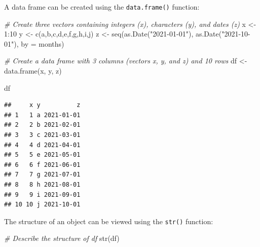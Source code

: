 \documentclass[
]{book}
\newenvironment{Shaded}{\begin{snugshade}}{\end{snugshade}}
\newcommand{\AttributeTok}[1]{\textcolor[rgb]{0.77,0.63,0.00}{#1}}
\newcommand{\CommentTok}[1]{\textcolor[rgb]{0.56,0.35,0.01}{\textit{#1}}}
\newcommand{\DecValTok}[1]{\textcolor[rgb]{0.00,0.00,0.81}{#1}}
\newcommand{\FunctionTok}[1]{\textcolor[rgb]{0.00,0.00,0.00}{#1}}
\newcommand{\NormalTok}[1]{#1}
\newcommand{\OtherTok}[1]{\textcolor[rgb]{0.56,0.35,0.01}{#1}}
\newcommand{\SpecialCharTok}[1]{\textcolor[rgb]{0.00,0.00,0.00}{#1}}
\newcommand{\StringTok}[1]{\textcolor[rgb]{0.31,0.60,0.02}{#1}}
\begin{document}
A data frame can be created using the \texttt{data.frame()} function:

\begin{Shaded}
\begin{Highlighting}[]
\CommentTok{\# Create three vectors containing integers (x), characters (y), and dates (z)}
\NormalTok{x }\OtherTok{\textless{}{-}} \DecValTok{1}\SpecialCharTok{:}\DecValTok{10}
\NormalTok{y }\OtherTok{\textless{}{-}} \FunctionTok{c}\NormalTok{(}\StringTok{\textquotesingle{}a\textquotesingle{}}\NormalTok{,}\StringTok{\textquotesingle{}b\textquotesingle{}}\NormalTok{,}\StringTok{\textquotesingle{}c\textquotesingle{}}\NormalTok{,}\StringTok{\textquotesingle{}d\textquotesingle{}}\NormalTok{,}\StringTok{\textquotesingle{}e\textquotesingle{}}\NormalTok{,}\StringTok{\textquotesingle{}f\textquotesingle{}}\NormalTok{,}\StringTok{\textquotesingle{}g\textquotesingle{}}\NormalTok{,}\StringTok{\textquotesingle{}h\textquotesingle{}}\NormalTok{,}\StringTok{\textquotesingle{}i\textquotesingle{}}\NormalTok{,}\StringTok{\textquotesingle{}j\textquotesingle{}}\NormalTok{)}
\NormalTok{z }\OtherTok{\textless{}{-}} \FunctionTok{seq}\NormalTok{(}\FunctionTok{as.Date}\NormalTok{(}\StringTok{"2021{-}01{-}01"}\NormalTok{), }\FunctionTok{as.Date}\NormalTok{(}\StringTok{"2021{-}10{-}01"}\NormalTok{), }\AttributeTok{by =} \StringTok{\textquotesingle{}months\textquotesingle{}}\NormalTok{)}

\CommentTok{\# Create a data frame with 3 columns (vectors x, y, and z) and 10 rows}
\NormalTok{df }\OtherTok{\textless{}{-}} \FunctionTok{data.frame}\NormalTok{(x, y, z)}

\NormalTok{df}
\end{Highlighting}
\end{Shaded}

\begin{verbatim}
##     x y          z
## 1   1 a 2021-01-01
## 2   2 b 2021-02-01
## 3   3 c 2021-03-01
## 4   4 d 2021-04-01
## 5   5 e 2021-05-01
## 6   6 f 2021-06-01
## 7   7 g 2021-07-01
## 8   8 h 2021-08-01
## 9   9 i 2021-09-01
## 10 10 j 2021-10-01
\end{verbatim}

The structure of an object can be viewed using the \texttt{str()} function:

\begin{Shaded}
\begin{Highlighting}[]
\CommentTok{\# Describe the structure of df}
\FunctionTok{str}\NormalTok{(df)}
\end{Highlighting}
\end{Shaded}
\end{document}
